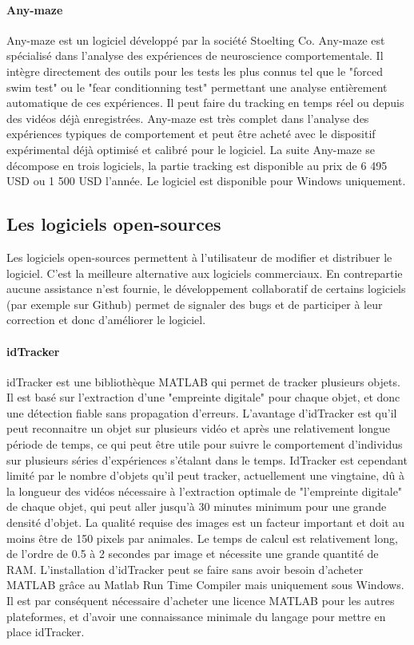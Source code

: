   \paragraph{Any-maze}
  Any-maze est un logiciel développé par la société Stoelting Co. Any-maze est spécialisé dans l'analyse des expériences de neuroscience comportementale. Il intègre directement des outils pour les tests les plus connus tel que le "forced swim test" ou le "fear conditionning test" permettant une analyse entièrement automatique de ces expériences. Il peut faire du tracking en temps réel ou depuis des vidéos déjà enregistrées.
\medbreak
  Any-maze est très complet dans l'analyse des expériences typiques de comportement et peut être acheté avec le dispositif expérimental déjà optimisé et calibré pour le logiciel. La suite Any-maze se décompose en trois logiciels, la partie tracking est disponible au prix de 6 495 USD ou 1 500 USD l'année. Le logiciel est disponible pour Windows uniquement. 

  \subsection{Les logiciels open-sources}
  Les logiciels open-sources permettent à l'utilisateur de modifier et distribuer le logiciel. C'est la meilleure alternative aux logiciels commerciaux. En contrepartie aucune assistance n'est fournie, le développement collaboratif de certains logiciels (par exemple sur Github) permet de signaler des bugs et de participer à leur correction et donc d'améliorer le logiciel.

  \paragraph{idTracker} idTracker \cite{perez2014idtracker} est une bibliothèque MATLAB qui permet de tracker plusieurs objets. Il est basé sur l'extraction d'une "empreinte digitale" pour chaque objet, et donc une détection fiable sans propagation d'erreurs. L'avantage d'idTracker est qu'il peut reconnaitre un objet sur plusieurs vidéo et après une relativement longue période de temps, ce qui peut être utile pour suivre le comportement d'individus sur plusieurs séries d'expériences s'étalant dans le temps. IdTracker est cependant limité par le nombre d'objets qu'il peut tracker, actuellement une vingtaine, dû à la longueur des vidéos nécessaire à l'extraction optimale de "l'empreinte digitale" de chaque objet, qui peut aller jusqu'à 30 minutes minimum pour une grande densité d'objet. La qualité requise des images est un facteur important et doit au moins être de 150 pixels par animales. Le temps de calcul est relativement long, de l'ordre de 0.5 à 2 secondes par image et nécessite une grande quantité de RAM. L'installation d'idTracker peut se faire sans avoir besoin d'acheter MATLAB grâce au Matlab Run Time Compiler mais uniquement sous Windows. Il est par conséquent nécessaire d'acheter une licence MATLAB pour les autres plateformes, et d'avoir une connaissance minimale du langage pour mettre en place idTracker.


